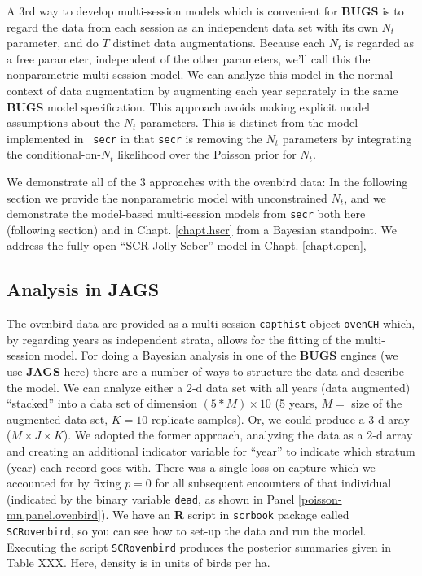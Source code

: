 A 3rd way to develop multi-session models which is convenient for {\bf
  BUGS} is to regard the data from each session as an independent data
set with its own $N_{t}$ parameter, and do $T$ distinct data augmentations. Because each $N_{t}$ is regarded
as a free parameter, independent of the other parameters, we'll call
this the nonparametric multi-session model.  
We can analyze this model
in the normal context of data augmentation by augmenting each year
separately in the same {\bf BUGS} model specification. This approach
avoids making explicit model assumptions about the $N_{t}$
parameters.  This is distinct from the model implemented in \mbox{\tt
  secr} in that \mbox{\tt secr} is removing the $N_{t}$ parameters by
integrating the conditional-on-$N_{t}$ likelihood over the Poisson
prior for $N_{t}$. 

We
demonstrate all of the 3 approaches with the ovenbird data: In the
following section we provide the nonparametric model with
unconstrained $N_{t}$, 
 and we demonstrate  the model-based
multi-session models from \mbox{\tt secr} both here (following section) and in
Chapt. \ref{chapt.hscr} from a Bayesian standpoint.
We address the fully open ``SCR Jolly-Seber''
model in Chapt. \ref{chapt.open},


\subsection{Analysis in JAGS}

The ovenbird data are provided as a multi-session \mbox{\tt capthist}
object \mbox{\tt ovenCH} which, by regarding years as independent
strata, allows for the fitting of the multi-session model.  For doing
a Bayesian analysis in one of the {\bf BUGS} engines (we use {\bf
  JAGS} here) there are a number of ways to structure the data and
describe the model.  We can analyze either a 2-d data set with all
years (data augmented) ``stacked'' into a data set of dimension $(5*M)
\times 10$ (5 years, $M=$ size of the augmented data set, $K=10$
replicate samples). Or, we could produce a 3-d aray ($M \times J
\times K$). We adopted the former approach, analyzing the data as a
2-d array and creating an additional indicator variable for ``year''
to indicate which stratum (year) each record goes with.  There was a
single loss-on-capture which we accounted for by fixing $p=0$ for all
subsequent encounters of that individual (indicated by the binary
variable \mbox{\tt dead}, as shown in Panel
\ref{poisson-mn.panel.ovenbird}).  We have an {\bf R} script in
\mbox{\tt scrbook} package called \mbox{\tt SCRovenbird}, so you can
see how to set-up the data and run the model.  Executing the script
\mbox{\tt SCRovenbird} produces the posterior summaries given in Table
XXX. Here, density is in units of birds per ha.






